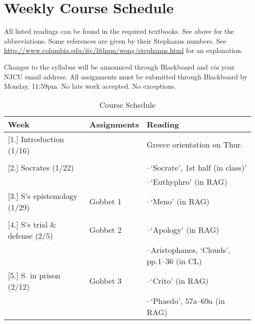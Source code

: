 \documentclass[article,oneside]{memoir}
\begin{document}
\section{Weekly Course Schedule}
All listed readings can be found in the required textbooks. See above for the abbreviations. Some references are given by their Stephanus numbers. See \href{http://www.columbia.edu/itc/lithum/wong/stephanus.html}{http://www.columbia.edu/itc/lithum/wong/stephanus.html} for an explanation. 

 Changes to the syllabus will be announced through Blackboard and \emph{via} your NJCU email address.  All assignments must be submitted through Blackboard by Monday, 11:59pm. No late work accepted. No exceptions.   \newline

\begin{center}
\begin{longtable}{p{4.5cm}p{2cm}p{6cm}}
 
  \caption{Course Schedule} \\
  \toprule
  \textbf{Week} &\textbf{Assignments} & \textbf{Reading} \\
  \midrule

  

[1.] Introduction	(1/16)	  			& 	 			& Greece orientation on Thur.  \\ 
								&		  		&    \\ [1.8\baselineskip]

[2.] Socrates (1/22)					& 				& --`Socrate', 1st half (in class)' \\
			        					&			  	& --`Euthyphro'  (in RAG) \\  [1.8\baselineskip]
	
[3.] S's epistemology  (1/29)				& Gobbet 1		&  --`Meno' (in RAG) \\
			       					&		  		&   \\[1.8\baselineskip]


[4.] S's trial \& defense (2/5)				& Gobbet 2		& --`Apology' (in RAG) \\
			     				   	& 			    	& --Aristophanes, `Clouds', pp.1--36 (in CL) \\ [1.8\baselineskip]

[5.] S. in prison (2/12)	& Gobbet 3		 & --`Crito' (in RAG)\\
								& 			    	&  --`Phaedo', 57a--69a (in RAG)\\ [1.8\baselineskip]




\end{longtable}
\end{center}
\end{document}
